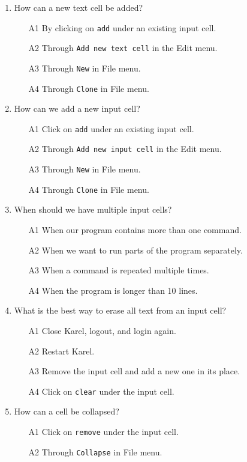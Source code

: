{{{{\begin{enumerate}
\item How can a new text cell be added?
\begin{enumerate}
\item[A1] By clicking on {\tt add} under an existing input cell.
\item[A2] Through {\tt Add new text cell} in the Edit menu.
\item[A3] Through {\tt New} in File menu.
\item[A4] Through {\tt Clone} in File menu.
\end{enumerate}
\item How can we add a new input cell?
\begin{enumerate}
\item[A1] Click on {\tt add} under an existing input cell.
\item[A2] Through {\tt Add new input cell} in the Edit menu.
\item[A3] Through {\tt New} in File menu.
\item[A4] Through {\tt Clone} in File menu.
\end{enumerate}
\item When should we have multiple input cells?
\begin{enumerate}
\item[A1] When our program contains more than one command.
\item[A2] When we want to run parts of the program separately.
\item[A3] When a command is repeated multiple times.
\item[A4] When the program is longer than 10 lines.
\end{enumerate}
\item What is the best way to erase all text from an input cell?
\begin{enumerate}
\item[A1] Close Karel, logout, and login again. 
\item[A2] Restart Karel.
\item[A3] Remove the input cell and add a new one in its place.
\item[A4] Click on {\tt clear} under the input cell.
\end{enumerate}
\item How can a cell be collapsed?
\begin{enumerate}
\item[A1] Click on {\tt remove} under the input cell.
\item[A2] Through {\tt Collapse} in File menu.

\end{enumerate}
\end{enumerate}}}}}
